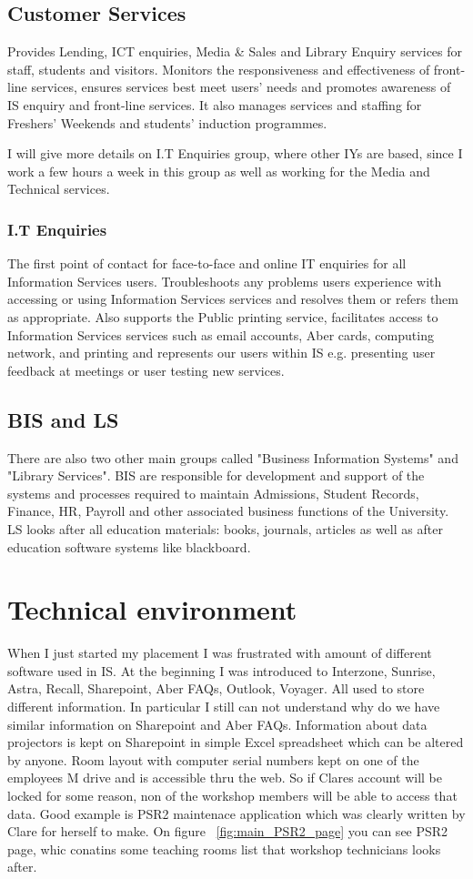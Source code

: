 \documentclass[10pt,a4paper,headinclude=true]{report}
\begin{document}
\section{Customer Services}
Provides Lending, ICT enquiries, Media \& Sales and Library Enquiry services for staff, students and visitors. Monitors the responsiveness and effectiveness of front-line services, ensures services best meet users' needs and promotes awareness of IS enquiry and front-line services. It also manages services and staffing for Freshers' Weekends and students' induction programmes.

I will give more details on I.T Enquiries group, where other IYs are based, since I work a few hours a week in this group as well as working for the Media and Technical services.

\subsection{I.T Enquiries}
The first point of contact for face-to-face and online IT enquiries for all Information Services users. Troubleshoots any problems users experience with accessing or using Information Services services and resolves them or refers them as appropriate. Also supports the Public printing service, facilitates access to Information Services services such as email accounts, Aber cards, computing network, and printing and represents our users within IS e.g. presenting user feedback at meetings or user testing new services.

\section{BIS and LS}
There are also two other main groups called "Business Information Systems" and "Library Services". BIS are  responsible for development and support of the systems and processes required to maintain Admissions, Student Records, Finance, HR, Payroll and other associated business functions of the University. LS looks after all education materials: books, journals, articles as well as after education software systems like blackboard.

\chapter{Technical environment}
When I just started my placement I was frustrated with amount of different software used in IS. At the beginning I was introduced to Interzone, Sunrise, Astra, Recall, Sharepoint, Aber FAQs, Outlook, Voyager. All used to store different information. In particular I still can not understand why do we have similar information on Sharepoint and Aber FAQs. Information about data projectors is kept on Sharepoint in simple Excel spreadsheet which can be altered by anyone. Room layout with computer serial numbers kept on one of the employees M drive and is accessible thru the web. So if Clares account will be locked for some reason, non of the workshop members will be able to access that data. Good example is PSR2 maintenace application which was clearly written by Clare for herself to make. On figure ~\ref{fig:main_PSR2_page} you can see PSR2 page, whic conatins some teaching rooms list that workshop technicians looks after.
\end{document}

